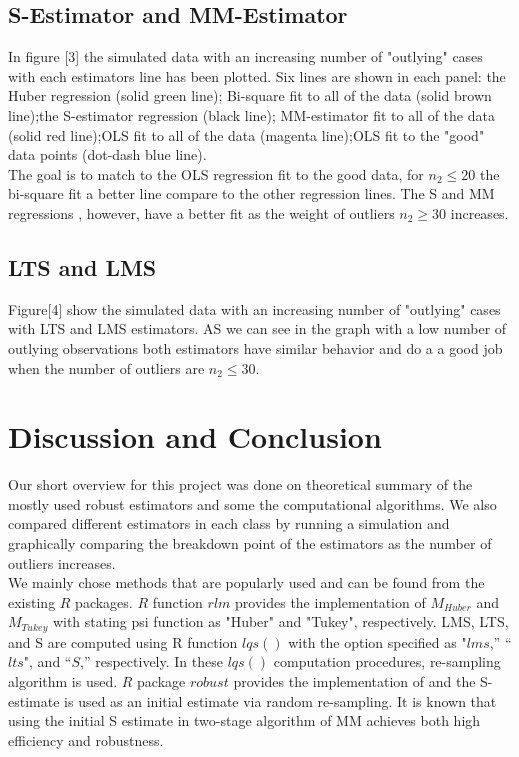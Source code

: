\documentclass[conference]{IEEEtran}
\begin{document}
\subsection{S-Estimator and MM-Estimator}
In figure [3] the simulated data with an increasing number of "outlying" cases with each estimators line has been plotted. Six lines are
shown in each panel: the Huber regression (solid green line); Bi-square fit to all of the data (solid brown line);the S-estimator regression (black line); MM-estimator fit to all of the data (solid red line);OLS fit to all of the data  (magenta line);OLS fit to  the "good" data points (dot-dash blue line).\\

The goal is to match to the OLS regression fit to the good data,  for $n_2\leq 20$ the bi-square fit a better line compare to the other regression lines. The S and MM regressions , however, have a better fit as the weight of outliers $n_2 \geq 30$ increases.
\subsection{LTS and LMS}
Figure[4] show the  simulated data with an increasing number of "outlying" cases with LTS and LMS estimators.  AS we can see in the graph with a low number of outlying observations both estimators have similar behavior and do a a good job when the number of outliers are $n_2\leq30$.
\section{Discussion and Conclusion}
Our short overview for this project was done on theoretical summary of the mostly used robust estimators and some the computational algorithms. We also compared different estimators in each class by running a simulation and graphically comparing the breakdown point of the estimators as the number of outliers increases.  \\

We mainly chose  methods that are popularly used and can be found from the existing $R$ packages. $R$ function $rlm$ provides the implementation of $M_{Huber}$ and $M_{Tukey}$ with stating
psi function as "Huber" and "Tukey", respectively. LMS, LTS, and S are computed using R function $lqs()$ with the option specified as "$lms$,” “$lts$", and “$S$,” respectively. In these $lqs()$ computation procedures, re-sampling algorithm is used. $R$ package $robust$ provides the implementation of and the S-estimate is used as an initial estimate via random re-sampling. It is known that using the initial S estimate in two-stage algorithm of MM achieves both high efficiency and robustness.\\
\end{document}
